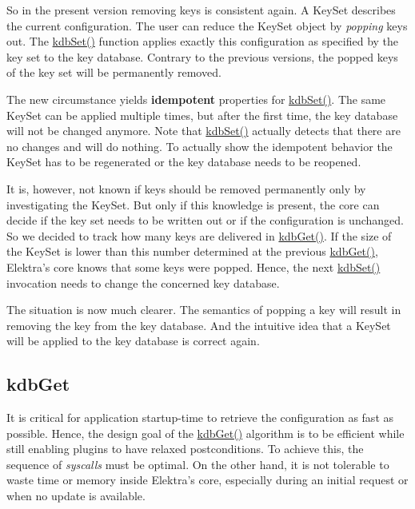 So in the present version removing keys is consistent again. A {\ttfamily Key\+Set} describes the current configuration. The user can reduce the {\ttfamily Key\+Set} object by {\itshape popping} keys out. The {\ttfamily \hyperlink{group__kdb_ga11436b058408f83d303ca5e996832bcf}{kdb\+Set()}} function applies exactly this configuration as specified by the key set to the key database. Contrary to the previous versions, the popped keys of the key set will be permanently removed.

The new circumstance yields {\bfseries idempotent} properties for {\ttfamily \hyperlink{group__kdb_ga11436b058408f83d303ca5e996832bcf}{kdb\+Set()}}. The same {\ttfamily Key\+Set} can be applied multiple times, but after the first time, the key database will not be changed anymore. Note that {\ttfamily \hyperlink{group__kdb_ga11436b058408f83d303ca5e996832bcf}{kdb\+Set()}} actually detects that there are no changes and will do nothing. To actually show the idempotent behavior the Key\+Set has to be regenerated or the key database needs to be reopened.

It is, however, not known if keys should be removed permanently only by investigating the {\ttfamily Key\+Set}. But only if this knowledge is present, the core can decide if the key set needs to be written out or if the configuration is unchanged. So we decided to track how many keys are delivered in {\ttfamily \hyperlink{group__kdb_ga28e385fd9cb7ccfe0b2f1ed2f62453a1}{kdb\+Get()}}. If the size of the {\ttfamily Key\+Set} is lower than this number determined at the previous {\ttfamily \hyperlink{group__kdb_ga28e385fd9cb7ccfe0b2f1ed2f62453a1}{kdb\+Get()}}, Elektra’s core knows that some keys were popped. Hence, the next {\ttfamily \hyperlink{group__kdb_ga11436b058408f83d303ca5e996832bcf}{kdb\+Set()}} invocation needs to change the concerned key database.

The situation is now much clearer. The semantics of popping a key will result in removing the key from the key database. And the intuitive idea that a {\ttfamily Key\+Set} will be applied to the key database is correct again.

\subsection*{kdb\+Get}

It is critical for application startup-\/time to retrieve the configuration as fast as possible. Hence, the design goal of the {\ttfamily \hyperlink{group__kdb_ga28e385fd9cb7ccfe0b2f1ed2f62453a1}{kdb\+Get()}} algorithm is to be efficient while still enabling plugins to have relaxed postconditions. To achieve this, the sequence of {\itshape syscalls} must be optimal. On the other hand, it is not tolerable to waste time or memory inside Elektra’s core, especially during an initial request or when no update is available.

